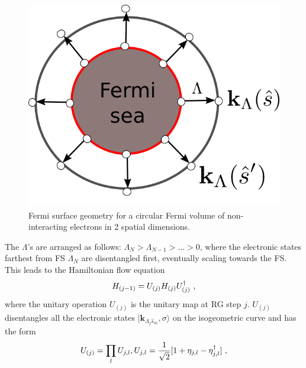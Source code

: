\documentclass[aps,prb,preprint,groupedaddress]{revtex4-2}
\begin{document}
\begin{figure}
\centering
\includegraphics[scale=0.5]{2dKondoTN.png}
\caption{Fermi surface geometry for a circular Fermi volume of non-interacting electrons in 2 spatial dimensions.}
\label{FSgeom}
\end{figure}
\par\noindent
The $\Lambda$'s are arranged as follows: $\Lambda_{N}>\Lambda_{N-1}>\ldots>0$, where the electronic states farthest from FS $\Lambda_{N}$ are disentangled first, eventually scaling towards the FS. This leads to the Hamiltonian flow equation
\begin{equation}
\centering
H_{(j-1)}=U_{(j)}H_{(j)}U^{\dagger}_{(j)}~,
\end{equation}
where the unitary operation $U_{(j)}$ is the unitary map at RG step $j$. $U_{(j)}$ disentangles all the electronic states 
$|\mathbf{k}_{\Lambda_{j}\hat{s}_{m}},\sigma\rangle$
on the isogeometric curve and has the form\cite{anirbanmotti}
\begin{equation}
\centering U_{(j)}=\prod_{l}U_{j,l}, U_{j,l}=\frac{1}{\sqrt{2}}[1+\eta_{j,l}-\eta^{\dagger}_{j,l}]~,
\end{equation}
\end{document}
